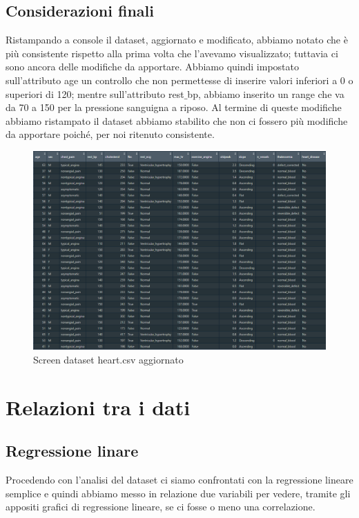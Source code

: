 \documentclass{article}
\begin{document}
\subsection { Considerazioni finali }
Ristampando a console il dataset, aggiornato e modificato, abbiamo notato che è più consistente rispetto alla prima volta che l’avevamo visualizzato; tuttavia ci sono ancora delle modifiche da apportare. Abbiamo quindi impostato sull’attributo age un controllo che non permettesse di inserire valori inferiori a 0 o superiori di 120; mentre sull’attributo rest$\_$bp, abbiamo inserito un range che va da 70 a 150 per la pressione sanguigna a riposo. Al termine di queste modifiche abbiamo ristampato il dataset abbiamo stabilito che non ci fossero più modifiche da apportare poiché, per noi ritenuto consistente. 



\begin{figure}[h]
	\centering
	\includegraphics[width=1\textwidth]{analyzed heart.png}
	\caption{Screen dataset heart.csv aggiornato}
	\label {fig:ds1}
\end{figure}

\newpage
\section { Relazioni tra i dati }
\subsection { Regressione linare }
Procedendo con l’analisi del dataset ci siamo confrontati con la regressione lineare semplice e quindi abbiamo messo in relazione due variabili per vedere, tramite gli appositi grafici di regressione lineare, se ci fosse o meno una correlazione.
\end{document}
